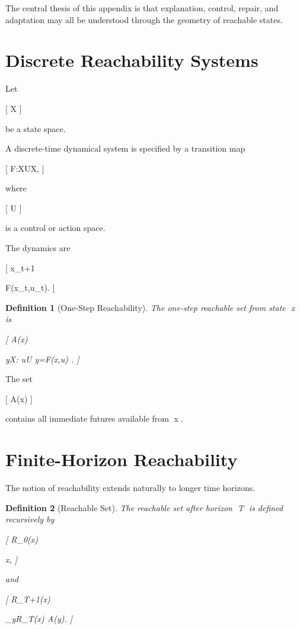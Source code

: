\documentclass[11pt,oneside,openany]{book}
\newtheorem{definition}{Definition}[chapter] \newtheorem{theorem}{Theorem}[chapter] \newtheorem{proposition}{Proposition}[chapter] \newtheorem{lemma}{Lemma}[chapter] \newtheorem{corollary}{Corollary}[chapter] \newtheorem{remark}{Remark}[chapter]
\begin{document}
The central thesis of this appendix is that explanation, control, repair, and adaptation may all be understood through the geometry of reachable states.

\section{Discrete Reachability Systems}

Let

[
X
]

be a state space.

A discrete-time dynamical system is specified by a transition map

[
F:X\times U\rightarrow X,
]

where

[
U
]

is a control or action space.

The dynamics are

[
x_{t+1}

F(x_t,u_t).
]

\begin{definition}[One-Step Reachability]

The one-step reachable set from state x is

[
A(x)

{
y\in X:
\exists u\in U
y=F(x,u)
}.
]

\end{definition}

The set

[
A(x)
]

contains all immediate futures available from x.

\section{Finite-Horizon Reachability}

The notion of reachability extends naturally to longer time horizons.

\begin{definition}[Reachable Set]

The reachable set after horizon T is defined recursively by

[
R_0(x)

{x},
]

and

[
R_{T+1}(x)

\bigcup_{y\in R_T(x)}
A(y).
]

\end{definition}
\end{document}
